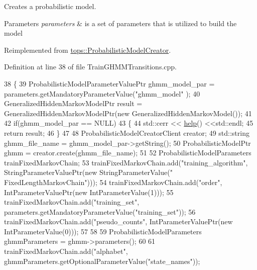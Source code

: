 Creates a probabilistic model. 


\begin{DoxyParams}{Parameters}
{\em parameters} & is a set of parameters that is utilized to build the model \\
\hline
\end{DoxyParams}


Reimplemented from \hyperlink{classtops_1_1ProbabilisticModelCreator_afed6c8ffa45fff446bdaa8b533da8f7c}{tops\+::\+Probabilistic\+Model\+Creator}.



Definition at line 38 of file Train\+G\+H\+M\+M\+Transitions.\+cpp.


\begin{DoxyCode}
38                                                                                                            
      \{
39     ProbabilisticModelParameterValuePtr ghmm\_model\_par = parameters.getMandatoryParameterValue(\textcolor{stringliteral}{"ghmm\_model"}
      );
40     GeneralizedHiddenMarkovModelPtr result = GeneralizedHiddenMarkovModelPtr(\textcolor{keyword}{new} 
      GeneralizedHiddenMarkovModel());
41 
42     \textcolor{keywordflow}{if}(ghmm\_model\_par == NULL)
43       \{
44         std::cerr << \hyperlink{classtops_1_1TrainGHMMTransitionsCreator_a39ecdb6afba99b304dc4c4603e310f67}{help}() <<std::endl;
45         \textcolor{keywordflow}{return} result;
46       \}
47 
48     ProbabilisticModelCreatorClient creator;
49     std::string ghmm\_file\_name = ghmm\_model\_par->getString();
50     ProbabilisticModelPtr ghmm = creator.create(ghmm\_file\_name);
51 
52     ProbabilisticModelParameters trainFixedMarkovChain;
53     trainFixedMarkovChain.add(\textcolor{stringliteral}{"training\_algorithm"}, StringParameterValuePtr(\textcolor{keyword}{new} StringParameterValue(\textcolor{stringliteral}{"
      FixedLengthMarkovChain"})));
54     trainFixedMarkovChain.add(\textcolor{stringliteral}{"order"}, IntParameterValuePtr(\textcolor{keyword}{new} IntParameterValue(1)));
55     trainFixedMarkovChain.add(\textcolor{stringliteral}{"training\_set"}, parameters.getMandatoryParameterValue(\textcolor{stringliteral}{"training\_set"}));
56     trainFixedMarkovChain.add(\textcolor{stringliteral}{"pseudo\_counts"}, IntParameterValuePtr(\textcolor{keyword}{new} IntParameterValue(0)));
57 
58 
59     ProbabilisticModelParameters ghmmParameters = ghmm->parameters();
60 
61     trainFixedMarkovChain.add(\textcolor{stringliteral}{"alphabet"}, ghmmParameters.getOptionalParameterValue(\textcolor{stringliteral}{"state\_names"}));

\end{DoxyCode}
